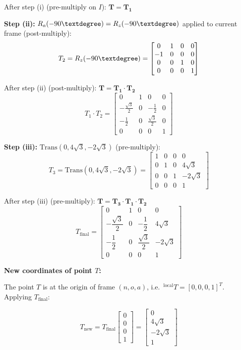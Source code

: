 \documentclass[12pt,a3paper]{article}
\begin{document}
\begin{enumerate}
\begin{tcolorbox}[enhanced,breakable,ansbox,colback=cD!4,colframe=cD,
  boxrule=0.8pt,arc=5pt,
  title={\textbf{Answer}},fonttitle=\bfseries\color{white},colbacktitle=cD]
After step (i) (pre-multiply on $I$): $\mathbf{T = T_1}$

\textbf{Step (ii):} $R_a(-90\textdegree) = R_z(-90\textdegree)$ applied to
current frame (post-multiply):
\[
  T_2 = R_z(-90\textdegree) =
  \begin{bmatrix}
    0 & 1 & 0 & 0 \\
   -1 & 0 & 0 & 0 \\
    0 & 0 & 1 & 0 \\
    0 & 0 & 0 & 1
  \end{bmatrix}
\]

After step (ii) (post-multiply): $\mathbf{T = T_1 \cdot T_2}$
\[
  T_1 \cdot T_2 =
  \begin{bmatrix}
    0 &  1 & 0 & 0 \\
    -\frac{\sqrt{3}}{2} & 0 & -\frac{1}{2} & 0 \\[4pt]
    -\frac{1}{2} & 0 & \frac{\sqrt{3}}{2} & 0 \\[4pt]
    0 & 0 & 0 & 1
  \end{bmatrix}
\]

\textbf{Step (iii):} $\mathrm{Trans}(0,4\sqrt{3},-2\sqrt{3})$
(pre-multiply):
\[
  T_3 = \mathrm{Trans}(0,4\sqrt{3},-2\sqrt{3}) =
  \begin{bmatrix}
    1&0&0&0\\0&1&0&4\sqrt{3}\\0&0&1&-2\sqrt{3}\\0&0&0&1
  \end{bmatrix}
\]

After step (iii) (pre-multiply): $\mathbf{T = T_3 \cdot T_1 \cdot T_2}$
\[
  T_{\text{final}} =
  \begin{bmatrix}
    0 &  1 & 0 & 0 \\[4pt]
    -\dfrac{\sqrt{3}}{2} & 0 & -\dfrac{1}{2} & 4\sqrt{3} \\[8pt]
    -\dfrac{1}{2} & 0 & \dfrac{\sqrt{3}}{2} & -2\sqrt{3} \\[8pt]
    0 & 0 & 0 & 1
  \end{bmatrix}
\]

\textbf{New coordinates of point $T$:}

The point $T$ is at the origin of frame $(n,o,a)$, i.e.\
${}^{\mathrm{local}}T = [0,0,0,1]^T$. Applying $T_{\text{final}}$:

\[
  T_{\text{new}} = T_{\text{final}}\begin{bmatrix}0\\0\\0\\1\end{bmatrix}
  = \begin{bmatrix}0\\4\sqrt{3}\\-2\sqrt{3}\\1\end{bmatrix}
\]


\end{tcolorbox}
\end{enumerate}
\end{document}

